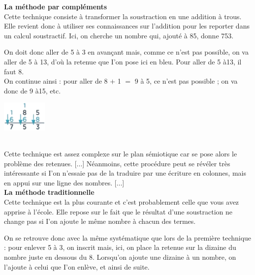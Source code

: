 \begin{center}
   \begin{minipage}{16cm}
      \textsf{{\bf La méthode par \og compléments \fg} \\
      Cette technique consiste à transformer la soustraction en une addition à trous. Elle revient donc à utiliser ses connaissances sur l'addition pour les reporter dans un calcul soustractif. Ici, on cherche un nombre qui, ajouté à 85, donne 753.} \\ [1mm]
      \begin{minipage}{13.3cm}
      \textsf{On doit donc aller de 5 à 3 en avançant mais, comme ce n'est pas possible, on va aller de 5 à 13, d'où la retenue que I'on pose ici en bleu. Pour aller de 5 à13, il faut 8. \\
      On continue ainsi : pour aller de 8 $+$ 1 $=$ 9 à 5, ce n'est pas possible ; on va donc de 9 à15, etc.} \smallskip
      \end{minipage}
      \quad
      \begin{minipage}{2.2cm}
         \includegraphics[width=2.2cm]{Nombres_et_calculs_did/Images/Num3_crpe_complement}
      \end{minipage} \\
      \textsf{Cette technique est assez complexe sur le plan sémiotique car se pose alors le problème des retenues. [...] Néanmoins, cette procédure peut se révéler très intéressante si I'on n'essaie pas de la traduire par une écriture en colonnes, mais en appui sur une ligne des nombres. [...] \\ [2mm]    
     {\bf La méthode \og traditionnelle \fg} \\
      Cette technique est la plus courante et c'est probablement celle que vous avez apprise à l'école. Elle repose sur le fait que le résultat d'une soustraction ne change pas si I'on ajoute le même nombre à chacun des termes.} \\ [1mm]
      \begin{minipage}{13cm}
         \textsf{On se retrouve donc avec la même systématique que lors de la première technique : pour enlever 5 à 3, on inscrit  \fg{} mais, ici, on place la retenue sur la dizaine du nombre juste en dessous du 8. Lorsqu'on ajoute une dizaine à un nombre, on l'ajoute à celui que I'on enlève, et ainsi de suite.} \smallskip
      \end{minipage}

\end{minipage}
\end{center}
